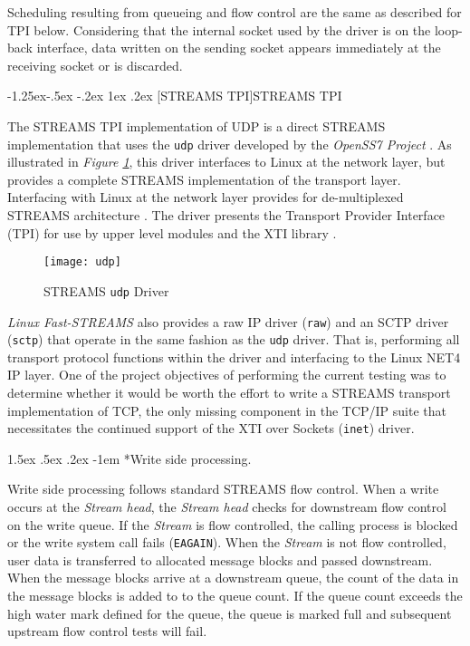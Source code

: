 \documentclass[letterpaper,final,notitlepage,twocolumn,10pt,twoside]{article}
\makeatletter
\renewcommand\subsubsection{\@startsection{subsubsection}{3}{\z@}%
                                     {-1.25ex\@plus -.5ex \@minus -.2ex}%
                                     {1ex \@plus .2ex}%
                                     {\normalfont\normalsize\bfseries}}
\renewcommand\paragraph{\@startsection{paragraph}{4}{\z@}%
                                    {1.5ex \@plus .5ex \@minus .2ex}%
                                    {-1em}%
                                    {\normalfont\normalsize\bfseries\slshape}}
\makeatother
\begin{document}
Scheduling resulting from queueing and flow control are the same as described for TPI below.
Considering that the internal socket used by the driver is on the loop-back interface, data written
on the sending socket appears immediately at the receiving socket or is discarded.

\subsubsection[STREAMS TPI]{STREAMS TPI}
\label{section:tpiudp}

The STREAMS TPI implementation of UDP is a direct STREAMS implementation that uses the
\texttt{udp} driver developed by the \textsl{OpenSS7 Project} \cite[]{openss7}.  As illustrated in
\textit{Figure \ref{figure:udp}}, this driver interfaces to Linux at the network layer, but
provides a complete STREAMS implementation of the transport layer.  Interfacing with Linux at the
network layer provides for de-multiplexed STREAMS architecture \cite[]{demux}.  The driver presents
the Transport Provider Interface (TPI) \cite[]{tpi} for use by upper level modules and the XTI
library \cite[]{xti}.

\begin{figure}[htp]
\center\texttt{[image: udp]}
\caption[STREAMS \texttt{udp} Driver]{STREAMS \texttt{udp} Driver}
\label{figure:udp}
\end{figure}

\textsl{Linux Fast-STREAMS} also provides a raw IP driver (\texttt{raw}) and an SCTP driver
(\texttt{sctp}) that operate in the same fashion as the \texttt{udp} driver.  That is, performing
all transport protocol functions within the driver and interfacing to the Linux NET4 IP layer.  One
of the project objectives of performing the current testing was to determine whether it would be
worth the effort to write a STREAMS transport implementation of TCP, the only missing component in
the TCP/IP suite that necessitates the continued support of the XTI over Sockets (\texttt{inet})
driver.

\paragraph*{Write side processing.}

Write side processing follows standard STREAMS flow control.  When a write occurs at the
\textit{Stream head}, the \textit{Stream head} checks for downstream flow control on the write
queue.  If the \textit{Stream} is flow controlled, the calling process is blocked or the write
system call fails (\texttt{EAGAIN}).  When the \textit{Stream} is not flow controlled, user data is
transferred to allocated message blocks and passed downstream.  When the message blocks arrive at a
downstream queue, the count of the data in the message blocks is added to to the queue count.  If
the queue count exceeds the high water mark defined for the queue, the queue is marked full and
subsequent upstream flow control tests will fail.
\end{document}
